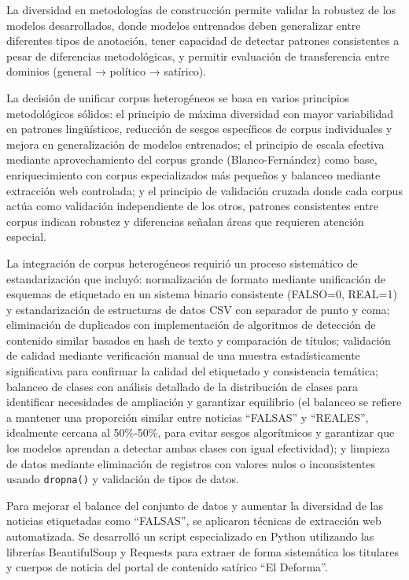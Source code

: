 La diversidad en metodologías de construcción permite validar la robustez de los modelos desarrollados, donde modelos entrenados deben generalizar entre diferentes tipos de anotación, tener capacidad de detectar patrones consistentes a pesar de diferencias metodológicas, y permitir evaluación de transferencia entre dominios (general → político → satírico).

La decisión de unificar corpus heterogéneos se basa en varios principios metodológicos sólidos: el principio de máxima diversidad con mayor variabilidad en patrones lingüísticos, reducción de sesgos específicos de corpus individuales y mejora en generalización de modelos entrenados; el principio de escala efectiva mediante aprovechamiento del corpus grande (Blanco-Fernández) como base, enriquecimiento con corpus especializados más pequeños y balanceo mediante extracción web controlada; y el principio de validación cruzada donde cada corpus actúa como validación independiente de los otros, patrones consistentes entre corpus indican robustez y diferencias señalan áreas que requieren atención especial.

La integración de corpus heterogéneos requirió un proceso sistemático de estandarización que incluyó: normalización de formato mediante unificación de esquemas de etiquetado en un sistema binario consistente (FALSO=0, REAL=1) y estandarización de estructuras de datos CSV con separador de punto y coma; eliminación de duplicados con implementación de algoritmos de detección de contenido similar basados en hash de texto y comparación de títulos; validación de calidad mediante verificación manual de una muestra estadísticamente significativa para confirmar la calidad del etiquetado y consistencia temática; balanceo de clases con análisis detallado de la distribución de clases para identificar necesidades de ampliación y garantizar equilibrio (el balanceo se refiere a mantener una proporción similar entre noticias ``FALSAS'' y ``REALES'', idealmente cercana al 50\%-50\%, para evitar sesgos algorítmicos y garantizar que los modelos aprendan a detectar ambas clases con igual efectividad); y limpieza de datos mediante eliminación de registros con valores nulos o inconsistentes usando \texttt{dropna()} y validación de tipos de datos.

Para mejorar el balance del conjunto de datos y aumentar la diversidad de las noticias etiquetadas como ``FALSAS'', se aplicaron técnicas de extracción web automatizada. Se desarrolló un script especializado en Python utilizando las librerías BeautifulSoup y Requests para extraer de forma sistemática los titulares y cuerpos de noticia del portal de contenido satírico ``El Deforma''.

